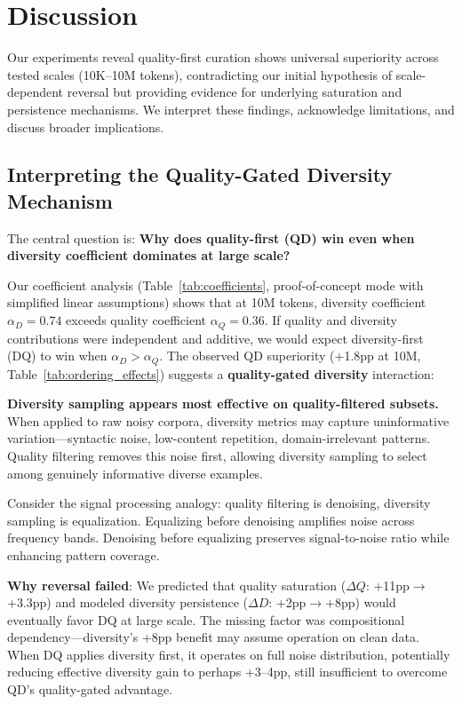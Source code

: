 \section{Discussion}

Our experiments reveal quality-first curation shows universal superiority across tested scales (10K--10M tokens), contradicting our initial hypothesis of scale-dependent reversal but providing evidence for underlying saturation and persistence mechanisms. We interpret these findings, acknowledge limitations, and discuss broader implications.

\subsection{Interpreting the Quality-Gated Diversity Mechanism}

The central question is: \textbf{Why does quality-first (QD) win even when diversity coefficient dominates at large scale?}

Our coefficient analysis (Table~\ref{tab:coefficients}, proof-of-concept mode with simplified linear assumptions) shows that at 10M tokens, diversity coefficient $\alpha_D=0.74$ exceeds quality coefficient $\alpha_Q=0.36$. If quality and diversity contributions were independent and additive, we would expect diversity-first (DQ) to win when $\alpha_D > \alpha_Q$. The observed QD superiority (+1.8pp at 10M, Table~\ref{tab:ordering_effects}) suggests a \textbf{quality-gated diversity} interaction:

\textbf{Diversity sampling appears most effective on quality-filtered subsets.} When applied to raw noisy corpora, diversity metrics may capture uninformative variation---syntactic noise, low-content repetition, domain-irrelevant patterns. Quality filtering removes this noise first, allowing diversity sampling to select among genuinely informative diverse examples.

Consider the signal processing analogy: quality filtering is denoising, diversity sampling is equalization. Equalizing before denoising amplifies noise across frequency bands. Denoising before equalizing preserves signal-to-noise ratio while enhancing pattern coverage.

\textbf{Why reversal failed}: We predicted that quality saturation ($\Delta Q$: +11pp$\rightarrow$+3.3pp) and modeled diversity persistence ($\Delta D$: +2pp$\rightarrow$+8pp) would eventually favor DQ at large scale. The missing factor was compositional dependency---diversity's +8pp benefit may assume operation on clean data. When DQ applies diversity first, it operates on full noise distribution, potentially reducing effective diversity gain to perhaps +3--4pp, still insufficient to overcome QD's quality-gated advantage.

